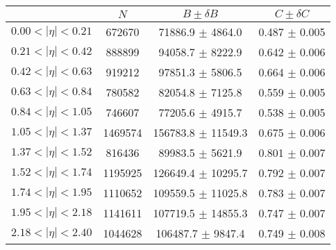 \begin{tabular}{lccc}
\hline
    &   $N$   & $B \pm \delta B$  &  $C \pm \delta C$ \\
\hline
$0.00 < |\eta| <0.21$          & 672670     & 71886.9    $\pm$ 4864.0 & 0.487      $\pm$ 0.005 \\
$0.21 < |\eta| <0.42$          & 888899     & 94058.7    $\pm$ 8222.9 & 0.642      $\pm$ 0.006 \\
$0.42 < |\eta| <0.63$          & 919212     & 97851.3    $\pm$ 5806.5 & 0.664      $\pm$ 0.006 \\
$0.63 < |\eta| <0.84$          & 780582     & 82054.8    $\pm$ 7125.8 & 0.559      $\pm$ 0.005 \\
$0.84 < |\eta| <1.05$          & 746607     & 77205.6    $\pm$ 4915.7 & 0.538      $\pm$ 0.005 \\
$1.05 < |\eta| <1.37$          & 1469574    & 156783.8   $\pm$ 11549.3 & 0.675      $\pm$ 0.006 \\
$1.37 < |\eta| <1.52$          & 816436     & 89983.5    $\pm$ 5621.9 & 0.801      $\pm$ 0.007 \\
$1.52 < |\eta| <1.74$          & 1195925    & 126649.4   $\pm$ 10295.7 & 0.792      $\pm$ 0.007 \\
$1.74 < |\eta| <1.95$          & 1110652    & 109559.5   $\pm$ 11025.8 & 0.783      $\pm$ 0.007 \\
$1.95 < |\eta| <2.18$          & 1141611    & 107719.5   $\pm$ 14855.3 & 0.747      $\pm$ 0.007 \\
$2.18 < |\eta| <2.40$          & 1044628    & 106487.7   $\pm$ 9847.4 & 0.749      $\pm$ 0.008 \\
\hline
\end{tabular}

